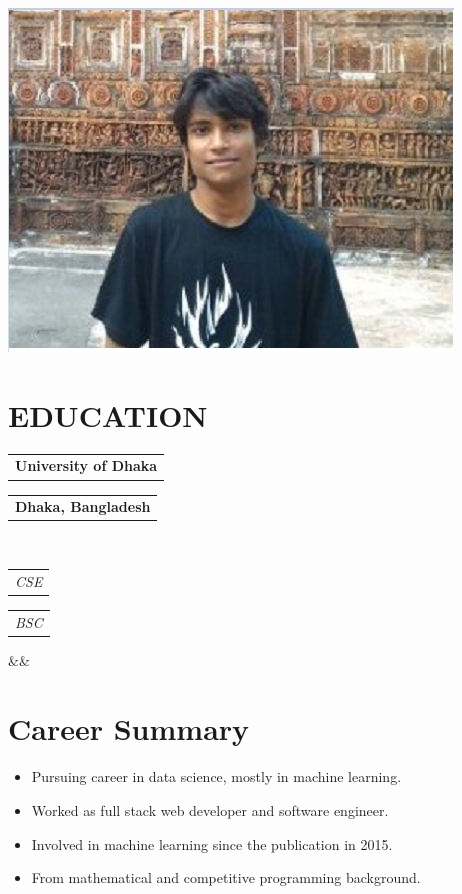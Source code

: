 \documentclass[11pt,a4paper,roman]{moderncv}
\makeatletter
\newcommand*{\customcventry}[7][.25em]{
  \begin{tabular}{@{}l} 
    {\bfseries #4}
  \end{tabular}
  \hfill%
  \begin{tabular}{l@{}}
     {\bfseries #5}
  \end{tabular} \\
  \begin{tabular}{@{}l} 
    {\itshape #3}
  \end{tabular}
  \hfill%
  \begin{tabular}{l@{}}
     {\itshape #2}
  \end{tabular}
  \ifx&#7&%
  \else{\\%
    \begin{minipage}{\maincolumnwidth}%
      \small#7%
    \end{minipage}}\fi%
  \par\addvspace{#1}}
\makeatother
\begin{document}

\makecvtitle
\vspace{-.2in}
\begin{center}
	\includegraphics[scale=.2]{pp1}
\end{center}
\vspace*{-.2in}

\section{EDUCATION}
{\customcventry{BSC}{CSE}{University of Dhaka}{Dhaka, Bangladesh}{}{}}

\section{Career Summary}
{
\begin{itemize}
	\item Pursuing career in data science, mostly in machine learning.
	\item Worked as full stack web developer and software engineer.
	\item Involved in machine learning since the publication in 2015.
	\item From mathematical and competitive programming background.
\end{itemize}
}
\end{document}
